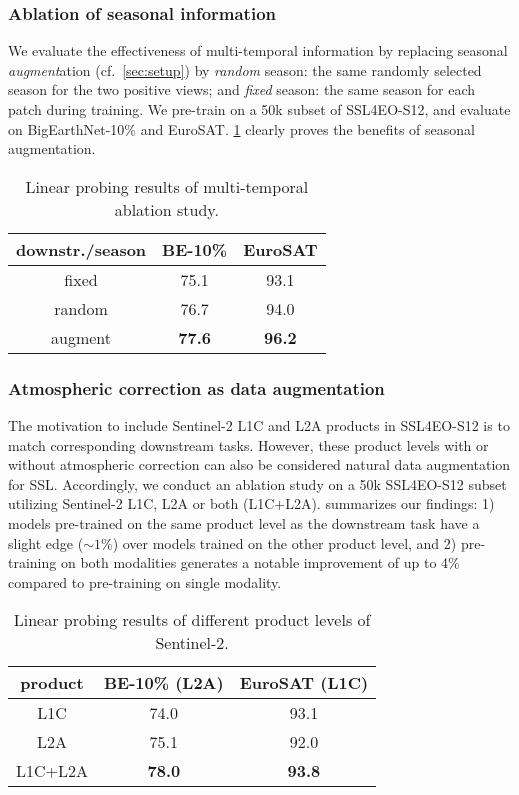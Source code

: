 \documentclass[lettersize,journal]{IEEEtran}
\begin{document}
\subsubsection{Ablation of seasonal information} We evaluate the effectiveness of multi-temporal information by replacing seasonal \textit{augment}ation (cf.\ \cref{sec:setup}) by \textit{random} season: the same randomly selected season for the two positive views; and \textit{fixed} season: the same season for each patch during training. We pre-train on a 50k subset of SSL4EO-S12, and evaluate on BigEarthNet-10\% and EuroSAT. \cref{tab:season} clearly proves the benefits of seasonal augmentation.
\vspace{-0.5em}
\begin{table}[h!]
\centering
\caption{Linear probing results of multi-temporal ablation study.}
\label{tab:season}
\begin{tabular}{ccc}
\hline
downstr./season & BE-10\%    & EuroSAT    \\ \hline \hline
fixed           & 75.1       & 93.1       \\
random          & 76.7 & 94.0 \\
augment         & \textbf{77.6} & \textbf{96.2} \\ \hline
\end{tabular}
\vspace{-1em}
\end{table} 


\subsubsection{Atmospheric correction as data augmentation} The motivation to include Sentinel-2 L1C and L2A products in SSL4EO-S12 is to match corresponding downstream tasks. However, these product levels with or without atmospheric correction can also be considered natural data augmentation for SSL. Accordingly, we conduct an ablation study on a 50k SSL4EO-S12 subset utilizing Sentinel-2 L1C, L2A or both (L1C+L2A).  summarizes our findings:
1) models pre-trained on the same product level as the downstream task have a slight edge ($\sim1\%$) over models trained on the other product level, and 2) pre-training on both modalities generates a notable improvement of up to 4\% compared to pre-training on single modality.
\vspace{-0.5em}
\begin{table}[h!]
\caption{Linear probing results of different product levels of Sentinel-2.}
\label{tab:level}
\centering
\begin{tabular}{ccc}
\hline
product & BE-10\% (L2A)                        & EuroSAT (L1C)                        \\ \hline \hline
L1C     & 74.0                                 & 93.1                          \\
L2A     & 75.1                          & 92.0                                 \\
L1C+L2A & \textbf{78.0} & \textbf{93.8} \\ \hline
\end{tabular}
\end{table}
\end{document}

